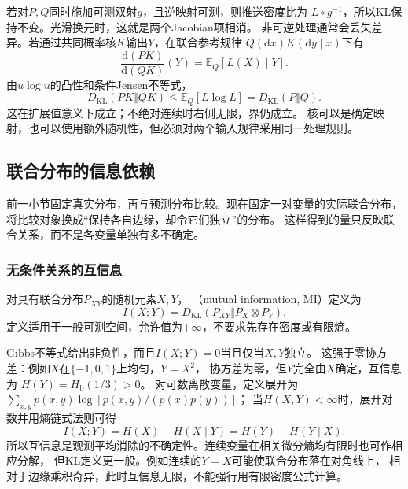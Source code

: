 若对\(P,Q\)同时施加可测双射\(g\)，且逆映射可测，则推送密度比为
\(L\circ g^{-1}\)，所以KL保持不变。光滑换元时，这就是两个Jacobian项相消。
非可逆处理通常会丢失差异。若通过共同概率核\(K\)输出\(Y\)，在联合参考规律
\(Q(\mathrm dx)K(\mathrm dy\mid x)\)下有
\[
  \frac{\mathrm d(PK)}{\mathrm d(QK)}(Y)=\mathbb E_Q[L(X)\mid Y].
\]
由\(u\log u\)的凸性和条件Jensen不等式，
\[
  D_{\mathrm{KL}}(PK\Vert QK)
  \leq\mathbb E_Q[L\log L]=D_{\mathrm{KL}}(P\Vert Q).
\]
这在扩展值意义下成立；不绝对连续时右侧无限，界仍成立。
核可以是确定映射，也可以使用额外随机性，但必须对两个输入规律采用同一处理规则。

\subsection{联合分布的信息依赖}
\label{sec:information-mutual-relations}

前一小节固定真实分布，再与预测分布比较。现在固定一对变量的实际联合分布，
将比较对象换成“保持各自边缘，却令它们独立”的分布。
这样得到的量只反映联合关系，而不是各变量单独有多不确定。

\subsubsection{无条件关系的互信息}
\label{sec:information-unconditional-mi}

\begin{definition}[互信息]
\label{def:information-mutual-information}
对具有联合分布\(P_{XY}\)的随机元素\(X,Y\)，
（mutual information, MI）定义为
\begin{equation}
  I(X;Y)=D_{\mathrm{KL}}(P_{XY}\Vert P_X\otimes P_Y).
  \label{eq:information-mutual-information}
\end{equation}
定义适用于一般可测空间，允许值为\(+\infty\)，不要求先存在密度或有限熵。
\end{definition}

Gibbs不等式给出非负性，而且\(I(X;Y)=0\)当且仅当\(X,Y\)独立。
这强于零协方差：例如\(X\)在\(\{-1,0,1\}\)上均匀，\(Y=X^2\)，
协方差为零，但\(Y\)完全由\(X\)确定，互信息为
\(H(Y)=H_{\mathrm b}(1/3)>0\)。
对可数离散变量，定义展开为
\(\sum_{x,y}p(x,y)\log[p(x,y)/(p(x)p(y))]\)；
当\(H(X,Y)<\infty\)时，展开对数并用熵链式法则可得
\begin{equation}
  I(X;Y)=H(X)-H(X\mid Y)=H(Y)-H(Y\mid X).
  \label{eq:information-mi-entropy-reduction}
\end{equation}
所以互信息是观测平均消除的不确定性。连续变量在相关微分熵均有限时也可作相应分解，
但KL定义更一般。例如连续的\(Y=X\)可能使联合分布落在对角线上，
相对于边缘乘积奇异，此时互信息无限，不能强行用有限密度公式计算。

